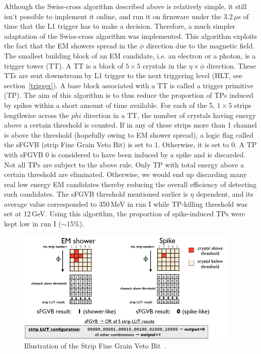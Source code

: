 Although the Swiss-cross algorithm described above is relatively simple, it still isn't possible to implement it online, and run it on firmware under the 3.2\,$\mu$s of time that the L1 trigger has to make a decision. Therefore, a much simpler adaptation of the Swiss-cross algorithm was implemented. This algorithm exploits the fact that the EM showers spread in the $\phi$ direction due to the magnetic field. The smallest building block of an EM candidate, i.e. an electron or a photon, is a trigger tower (TT). A TT is a block of $5\times5$ crystals in the $\eta\times\phi$ direction. These TTs are sent downstream by L1 trigger to the next triggering level (HLT, see section~\ref{trigger}). A base block associated with a TT is called a trigger primitive (TP). The aim of this algorithm is to thus reduce the proportion of TPs induced by spikes within a short amount of time available. For each of the 5, $1\times5$ strips lengthwise across the $phi$ direction in a TT, the number of crystals  having energy above a certain threshold is counted. If in any of these strips more than 1 channel is above the threshold (hopefully owing to EM shower spread), a logic flag called the sFGVB (strip Fine Grain Veto Bit) is set to 1. Otherwise, it is set to 0. A TP with sFGVB 0 is considered to have been induced by a spike and is discarded. Not all TPs are subject to the above rule. Only TP with total energy above a certain threshold are eliminated. Otherwise, we would end up discarding many real low energy EM candidates thereby reducing the overall efficiency of detecting such candidates. The sFGVB threshold mentioned earlier is $\eta$ dependent, and its average value corresponded to 350\,MeV in run I while TP-killing threshold was set at 12\,GeV. Using this algorithm, the proportion of spike-induced TPs were kept low in run I ($\sim15\%$).      


\begin{figure}
  \begin{center}
  \captionsetup{justification=centering}
  \includegraphics[width=0.95\textwidth,keepaspectratio]{plots_and_figures/chapter3/sfgvb.png}
\caption{Illustration of the Strip Fine Grain Veto Bit~\cite{sfgvb}.}
\label{fig:swisscross}
\end{center}
\end{figure}

